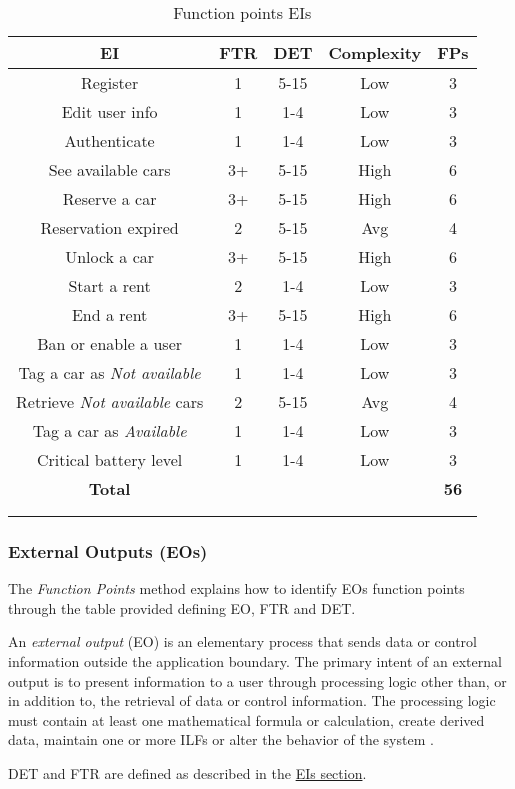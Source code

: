 \begin{longtable}{ccccc}
\toprule
\textbf{EI}	& FTR & DET & 	Complexity  & \textbf{FPs}\\
\midrule
Register & 1 & 5-15 &	Low & 3 \\
Edit user info & 1 & 1-4 &	Low & 3 \\
Authenticate &1 & 1-4 & Low & 3 \\
See available cars & 3+ & 5-15 & High & 6 \\
Reserve a car & 3+ & 5-15 & High & 6 \\
Reservation expired & 2 & 5-15 & Avg & 4 \\
Unlock a car & 3+ & 5-15 & High & 6 \\
Start a rent & 2 & 1-4 &	Low & 3 \\
End a rent & 3+ & 5-15 & High & 6 \\
Ban or enable a user & 1 & 1-4 &	Low & 3 \\
Tag a car as \emph{Not available} & 1 & 1-4 &	Low & 3 \\
Retrieve \emph{Not available} cars & 2 & 5-15 & Avg & 4\\
Tag a car as \emph{Available} & 1 & 1-4 &	Low & 3\\
Critical battery level & 1 & 1-4 &	Low & 3\\
\midrule
\textbf{Total} & & & &  \textbf{56}\\
\bottomrule \\
\caption{Function points EIs}
\label{tbl:eiFP}
\end{longtable}


\subsubsection{External Outputs (EOs)} 

The \emph{Function Points} method explains how to identify EOs function points through the table provided defining EO, FTR and DET.

An \textit{external output} (EO) is an elementary process that sends data or control information outside the application boundary. The primary intent of an external output is to present information to a user through processing logic other than, or in addition to, the retrieval of data or control information. The processing logic must contain at least one mathematical formula or calculation, create derived data, maintain one or more ILFs or alter the behavior of the system \cite{FP}.

DET and FTR are defined as described in the \hyperref[sec:EIs]{EIs section}.\\

